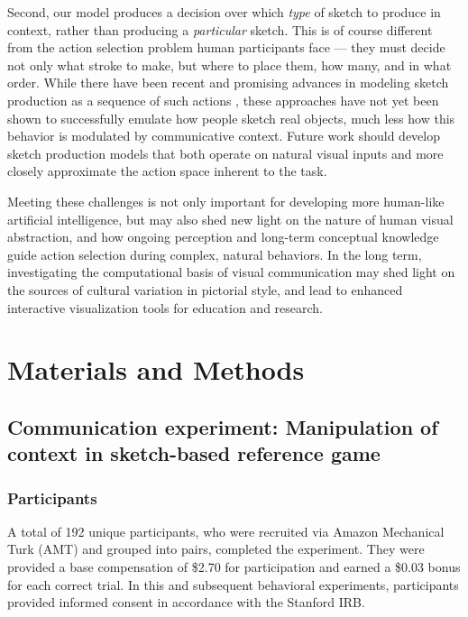 \documentclass{svjour3}
\begin{document}
Second, our model produces a decision over which \textit{type} of sketch to produce in context, rather than producing a \textit{particular} sketch.  
This is of course different from the action selection problem human participants face --- they must decide not only what stroke to make, but where to place them, how many, and in what order.
While there have been recent and promising advances in modeling sketch production as a sequence of such actions \citep*{lake2015human,ha2017neural,ganin2018synthesizing}, these approaches have not yet been shown to successfully emulate how people sketch real objects, much less how this behavior is modulated by communicative context. 
Future work should develop sketch production models that both operate on natural visual inputs and more closely approximate the action space inherent to the task.

Meeting these challenges is not only important for developing more human-like artificial intelligence, but may also shed new light on the nature of human visual abstraction, and how ongoing perception and long-term conceptual knowledge guide action selection during complex, natural behaviors. 
In the long term, investigating the computational basis of visual communication may shed light on the sources of cultural variation in pictorial style, and lead to enhanced interactive visualization tools for education and research.

\section*{Materials and Methods}

\subsection*{Communication experiment: Manipulation of context in sketch-based reference game}

\subsubsection*{Participants}
A total of 192 unique participants, who were recruited via Amazon Mechanical Turk (AMT) and grouped into pairs, completed the experiment. 
They were provided a base compensation of \$2.70 for participation and earned a \$0.03 bonus for each correct trial. 
In this and subsequent behavioral experiments, participants provided informed consent in accordance with the Stanford IRB.
\end{document}
